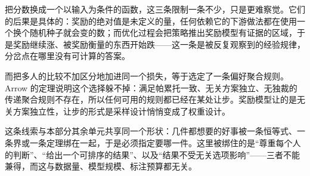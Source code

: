把分数换成一个以输入为条件的函数，这三条限制一条不少，只是更难察觉。它们的后果是具体的：奖励的绝对值是未定义的量，任何依赖它的下游做法都在使用一个换个随机种子就会变的数；而优化过程会把策略推出奖励模型有证据的区域，于是奖励继续涨、被奖励衡量的东西开始跌——这一条是被反复观察到的经验规律，分岔点在哪里没有可计算的答案。

而把多人的比较不加区分地加进同一个损失，等于选定了一条偏好聚合规则。Arrow 的定理说明这个选择躲不掉：满足帕累托一致、无关方案独立、无独裁的传递聚合规则不存在，所以任何可用的规则都已经在某处让步。奖励模型让的是无关方案独立性，让步的形式是采样设计悄悄变成了权重设计。

这条线索与本部分其余单元共享同一个形状：几件都想要的好事被一条恒等式、一条界或一条定理绑在一起，于是必须指定要哪一件。这里被绑住的是``尊重每个人的判断''、``给出一个可排序的结果''、以及``结果不受无关选项影响''——三者不能兼得，而这与数据量、模型规模、标注预算都无关。
